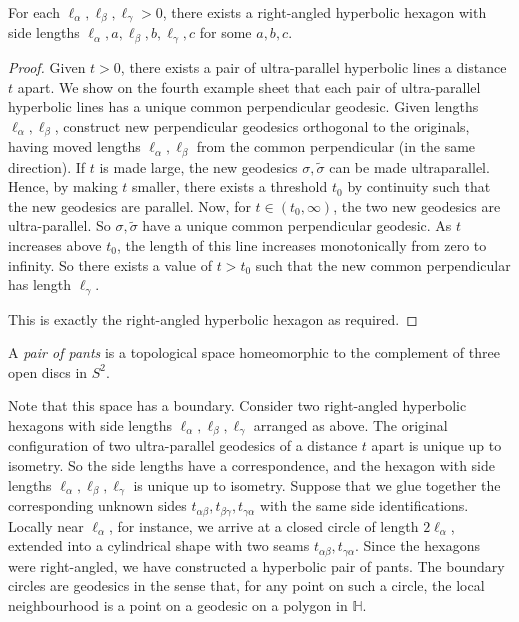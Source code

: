 \begin{lemma}
	For each \( \ell_\alpha, \ell_\beta, \ell_\gamma > 0 \), there exists a right-angled hyperbolic hexagon with side lengths \( \ell_\alpha, a, \ell_\beta, b, \ell_\gamma, c \) for some \( a,b,c \).
\end{lemma}
\begin{proof}
	Given \( t > 0 \), there exists a pair of ultra-parallel hyperbolic lines a distance \( t \) apart.
	We show on the fourth example sheet that each pair of ultra-parallel hyperbolic lines has a unique common perpendicular geodesic.
	Given lengths \( \ell_\alpha, \ell_\beta \), construct new perpendicular geodesics orthogonal to the originals, having moved lengths \( \ell_\alpha, \ell_\beta \) from the common perpendicular (in the same direction).
	If \( t \) is made large, the new geodesics \( \sigma, \widetilde \sigma \) can be made ultraparallel.
	Hence, by making \( t \) smaller, there exists a threshold \( t_0 \) by continuity such that the new geodesics are parallel.
	Now, for \( t \in (t_0,\infty) \), the two new geodesics are ultra-parallel.
	So \( \sigma, \widetilde \sigma \) have a unique common perpendicular geodesic.
	As \( t \) increases above \( t_0 \), the length of this line increases monotonically from zero to infinity.
	So there exists a value of \( t > t_0 \) such that the new common perpendicular has length \( \ell_\gamma \).
	\begin{center}
	\end{center}
	This is exactly the right-angled hyperbolic hexagon as required.
\end{proof}
\begin{definition}
	A \textit{pair of pants} is a topological space homeomorphic to the complement of three open discs in \( S^2 \).
\end{definition}
Note that this space has a boundary.
Consider two right-angled hyperbolic hexagons with side lengths \( \ell_\alpha, \ell_\beta, \ell_\gamma \) arranged as above.
The original configuration of two ultra-parallel geodesics of a distance \( t \) apart is unique up to isometry.
So the side lengths have a correspondence, and the hexagon with side lengths \( \ell_\alpha, \ell_\beta, \ell_\gamma \) is unique up to isometry.
Suppose that we glue together the corresponding unknown sides \( t_{\alpha\beta}, t_{\beta\gamma}, t_{\gamma\alpha} \) with the same side identifications.
Locally near \( \ell_\alpha \), for instance, we arrive at a closed circle of length \( 2\ell_\alpha \), extended into a cylindrical shape with two seams \( t_{\alpha\beta}, t_{\gamma\alpha} \).
Since the hexagons were right-angled, we have constructed a hyperbolic pair of pants.
The boundary circles are geodesics in the sense that, for any point on such a circle, the local neighbourhood is a point on a geodesic on a polygon in \( \mathbb H \).

